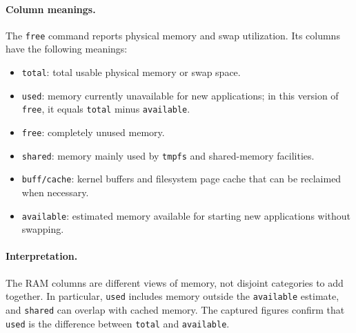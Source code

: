
\paragraph{Column meanings.}
The \texttt{free} command reports physical memory and swap utilization. Its
columns have the following meanings:

\begin{itemize}[leftmargin=*]
    \item \texttt{total}: total usable physical memory or swap space.
    \item \texttt{used}: memory currently unavailable for new applications;
    in this version of \texttt{free}, it equals \texttt{total} minus
    \texttt{available}.
    \item \texttt{free}: completely unused memory.
    \item \texttt{shared}: memory mainly used by \texttt{tmpfs} and shared-memory facilities.
    \item \texttt{buff/cache}: kernel buffers and filesystem page cache that can be reclaimed when necessary.
    \item \texttt{available}: estimated memory available for starting new applications without swapping.
\end{itemize}

\paragraph{Interpretation.}
The RAM columns are different views of memory, not disjoint categories to add
together. In particular, \texttt{used} includes memory outside the
\texttt{available} estimate, and \texttt{shared} can overlap with cached memory.
The captured figures confirm that \texttt{used} is the difference between
\texttt{total} and \texttt{available}.
